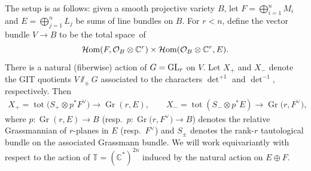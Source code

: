 \documentclass[pdftex]{sigma}
\numberwithin{equation}{section}
\newcommand{\cc}[1]{\mathcal{#1}} %
\newcommand{\CC}{\mathbb{C}}
\newcommand{\torus}{\mathbb{T}}
\DeclareMathOperator{\tot}{tot}
\DeclareMathOperator{\Gr}{Gr}
\newcommand{\F}{F}
\newcommand{\E}{E}
\newcommand{\MB}{M}
\newcommand{\LB}{L}
\begin{document}
The setup is as follows: given a smooth projective variety $B$, let $\F = \bigoplus_{i=1}^n \MB_i$ and $\E = \bigoplus_{j=1}^n \LB_j$ be sums of line bundles on $B$. For $r < n$, define the vector bundle $V \to B$ to be the total space~of
\[
\mathcal{H}{\rm om}(\F, \cc O_B \otimes \CC^r) \times \mathcal{H}{\rm om}(\cc O_B \otimes \CC^r, \E).
\]
There is a natural (fiberwise) action of $G = {\rm GL}_r$ on $V$.
Let $X_+$ and $X_-$ denote the GIT quotients $V\sslash_\pm G$ associated to the characters $\det^{+1}$ and $\det^{-1}$, respectively. Then
\begin{align*}
X_+ = \tot\bigl(S_+ \otimes p^*\F^\vee\bigr) \to \Gr(r, \E), \qquad
X_- =\tot(S_- \otimes p^*\E) \to \Gr\bigl(r, \F^\vee\bigr),
\end{align*}
where $p\colon \Gr(r, \E) \to B $ \big(resp.\ $p\colon \Gr\bigl(r, \F^\vee\bigr) \to B$\big) denotes the relative Grassmannian of $r$-planes in $\E$ \big(resp.\ $\F^\vee$\big) and $S_\pm$ denotes the rank-$r$ tautological bundle on the associated Grassmann bundle. We will work equivariantly with respect to the action of $\torus = (\CC^*)^{2n}$ induced by the natural action on $E \oplus F$.
\end{document}

